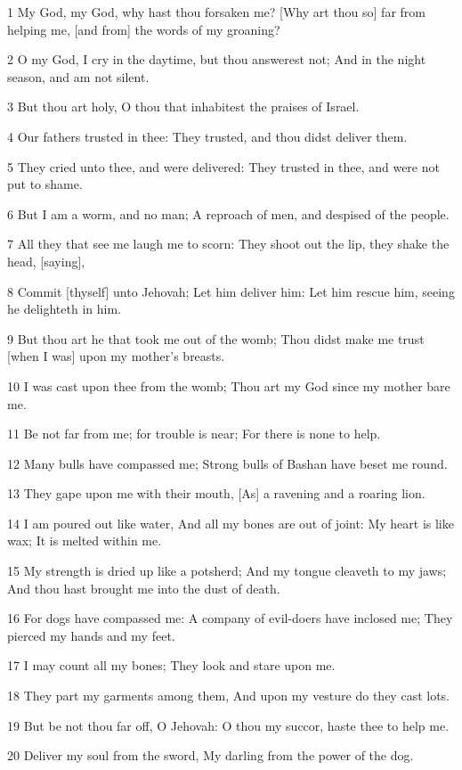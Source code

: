 \par 1 My God, my God, why hast thou forsaken me? [Why art thou so] far from helping me, [and from] the words of my groaning?
\par 2 O my God, I cry in the daytime, but thou answerest not; And in the night season, and am not silent.
\par 3 But thou art holy, O thou that inhabitest the praises of Israel.
\par 4 Our fathers trusted in thee: They trusted, and thou didst deliver them.
\par 5 They cried unto thee, and were delivered: They trusted in thee, and were not put to shame.
\par 6 But I am a worm, and no man; A reproach of men, and despised of the people.
\par 7 All they that see me laugh me to scorn: They shoot out the lip, they shake the head, [saying],
\par 8 Commit [thyself] unto Jehovah; Let him deliver him: Let him rescue him, seeing he delighteth in him.
\par 9 But thou art he that took me out of the womb; Thou didst make me trust [when I was] upon my mother's breasts.
\par 10 I was cast upon thee from the womb; Thou art my God since my mother bare me.
\par 11 Be not far from me; for trouble is near; For there is none to help.
\par 12 Many bulls have compassed me; Strong bulls of Bashan have beset me round.
\par 13 They gape upon me with their mouth, [As] a ravening and a roaring lion.
\par 14 I am poured out like water, And all my bones are out of joint: My heart is like wax; It is melted within me.
\par 15 My strength is dried up like a potsherd; And my tongue cleaveth to my jaws; And thou hast brought me into the dust of death.
\par 16 For dogs have compassed me: A company of evil-doers have inclosed me; They pierced my hands and my feet.
\par 17 I may count all my bones; They look and stare upon me.
\par 18 They part my garments among them, And upon my vesture do they cast lots.
\par 19 But be not thou far off, O Jehovah: O thou my succor, haste thee to help me.
\par 20 Deliver my soul from the sword, My darling from the power of the dog.
